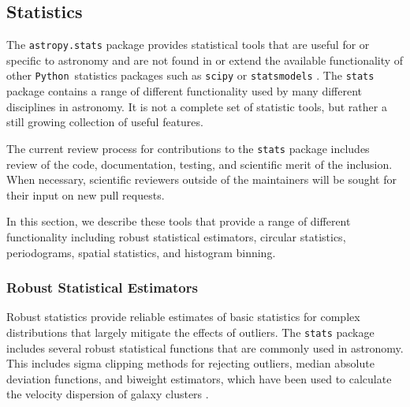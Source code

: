 \documentclass[modern]{aastex61}
\newcommand{\package}[1]{\texttt{#1}\xspace}
\newcommand{\python}{\package{Python}\xspace}
\begin{document}
\subsection{Statistics}

The \package{astropy.stats} package provides statistical tools that
are useful for or specific to astronomy and are not found in or extend
the available functionality of other \python\ statistics packages such
as \package{scipy} \citep{scipy} or \package{statsmodels}
\citep{seabold2010statsmodels}.  The \package{stats} package contains
a range of different functionality used by many different disciplines
in astronomy.  It is not a complete set of statistic tools, but rather
a still growing collection of useful features.

The current review process for contributions to the \package{stats} package includes review of the code, documentation, testing, and scientific merit of the inclusion.  When necessary, scientific reviewers outside of the maintainers will be sought for their input on new pull requests.

In this section, we describe these tools that provide a range of different functionality including robust statistical estimators, circular statistics, periodograms, spatial statistics, and histogram binning.



\subsubsection{Robust Statistical Estimators}

Robust statistics provide reliable estimates of basic statistics for complex distributions that largely mitigate the effects of outliers. The \package{stats} package includes several robust statistical functions that are commonly used in astronomy. This includes sigma clipping methods for rejecting outliers, median absolute deviation functions, and biweight estimators, which have been used to calculate the velocity dispersion of galaxy clusters \citep{Beers1990}.
\end{document}
